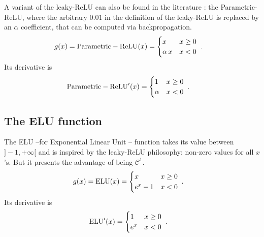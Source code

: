 A variant of the leaky-ReLU can also be found in the literature : the Parametric-ReLU, where the arbitrary $0.01$ in the definition of the leaky-ReLU is replaced by an $\alpha$ coefficient, that can be
computed via backpropagation.
\begin{align}
g(x)&={\rm Parametric-ReLU}(x)=\begin{cases}
      x & x\geq 0 \\
      \alpha\,x & x<0
   \end{cases}\;.
\end{align}
Its derivative is
\begin{align}
{\rm Parametric-ReLU}'(x)&=\begin{cases}
      1 & x\geq 0 \\
      \alpha & x<0
   \end{cases}\;.
\end{align}

\subsection{The ELU function}

The ELU --for Exponential Linear Unit -- function takes its value between $]-1,+\infty[$ and is inspired by the leaky-ReLU philosophy: non-zero values for all $x$'s. But it presents the advantage of being $\mathcal{C}^1$.
\begin{align}
g(x)&={\rm ELU}(x)=\begin{cases}
      x & x\geq 0 \\
      e^x-1 & x<0
   \end{cases}\;.
\end{align}
Its derivative is
\begin{align}
{\rm ELU}'(x)&=\begin{cases}
      1 & x\geq 0 \\
      e^x & x<0
   \end{cases}\;.
\end{align}


